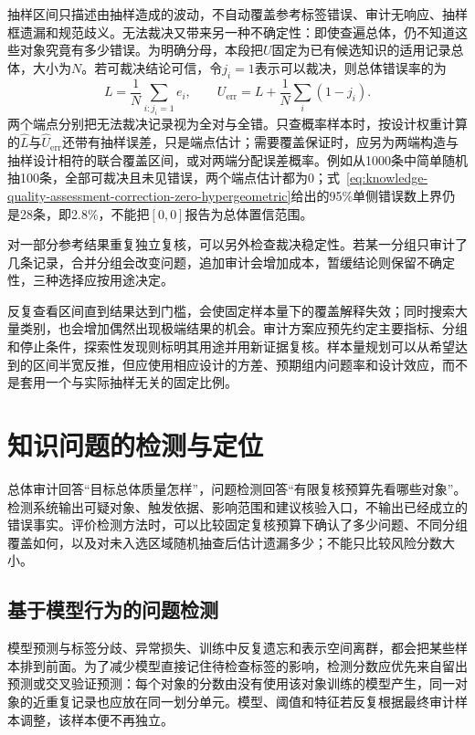 抽样区间只描述由抽样造成的波动，不自动覆盖参考标签错误、审计无响应、抽样框遗漏和规范歧义。无法裁决又带来另一种不确定性：即使查遍总体，仍不知道这些对象究竟有多少错误。为明确分母，本段把$U$固定为已有候选知识的适用记录总体，大小为$N$。若可裁决结论可信，令$j_i=1$表示可以裁决，则总体错误率的为
\[
  L=\frac{1}{N}\sum_{i:j_i=1}e_i,
  \qquad
  U_{\mathrm{err}}=L+\frac{1}{N}\sum_i(1-j_i).
\]
两个端点分别把无法裁决记录视为全对与全错。只查概率样本时，按设计权重计算的$\widehat L$与$\widehat U_{\mathrm{err}}$还带有抽样误差，只是端点估计；需要覆盖保证时，应另为两端构造与抽样设计相符的联合覆盖区间，或对两端分配误差概率。例如从1000条中简单随机抽100条，全部可裁决且未见错误，两个端点估计都为0；式~\eqref{eq:knowledge-quality-assessment-correction-zero-hypergeometric}给出的95\%单侧错误数上界仍是28条，即2.8\%，不能把$[0,0]$报告为总体置信范围。

对一部分参考结果重复独立复核，可以另外检查裁决稳定性。若某一分组只审计了几条记录，合并分组会改变问题，追加审计会增加成本，暂缓结论则保留不确定性，三种选择应按用途决定。

反复查看区间直到结果达到门槛，会使固定样本量下的覆盖解释失效；同时搜索大量类别，也会增加偶然出现极端结果的机会。审计方案应预先约定主要指标、分组和停止条件，探索性发现则标明其用途并用新证据复核。样本量规划可以从希望达到的区间半宽反推，但应使用相应设计的方差、预期组内问题率和设计效应，而不是套用一个与实际抽样无关的固定比例。

\section{知识问题的检测与定位}
\label{sec:knowledge-quality-assessment-correction-detection}

总体审计回答“目标总体质量怎样”，问题检测回答“有限复核预算先看哪些对象”。检测系统输出可疑对象、触发依据、影响范围和建议核验入口，不输出已经成立的错误事实。评价检测方法时，可以比较固定复核预算下确认了多少问题、不同分组覆盖如何，以及对未入选区域随机抽查后估计遗漏多少；不能只比较风险分数大小。

\subsection{基于模型行为的问题检测}
\label{sec:knowledge-quality-assessment-correction-model-detection}

模型预测与标签分歧、异常损失、训练中反复遗忘和表示空间离群，都会把某些样本排到前面。为了减少模型直接记住待检查标签的影响，检测分数应优先来自留出预测或交叉验证预测：每个对象的分数由没有使用该对象训练的模型产生，同一对象的近重复记录也应放在同一划分单元。模型、阈值和特征若反复根据最终审计样本调整，该样本便不再独立。

